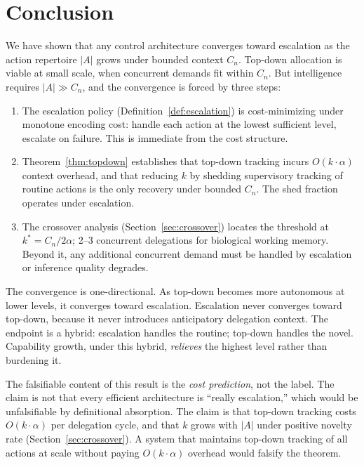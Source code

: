 \documentclass[11pt]{article}
\theoremstyle{definition}
\begin{document}
\section{Conclusion}
\label{sec:conclusion}

We have shown that any control architecture converges toward
escalation as the action repertoire $|A|$ grows under bounded context
$C_n$. Top-down allocation is viable at small scale, when concurrent
demands fit within $C_n$. But intelligence requires $|A| \gg C_n$,
and the convergence is forced by three steps:

\begin{enumerate}
\item The escalation policy (Definition~\ref{def:escalation}) is
   cost-minimizing under monotone encoding cost: handle each action at
   the lowest sufficient level, escalate on failure. This is immediate
   from the cost structure.

\item Theorem~\ref{thm:topdown} establishes that top-down tracking
   incurs $O(k \cdot \alpha)$ context overhead, and that reducing $k$
   by shedding supervisory tracking of routine actions is the only
   recovery under bounded $C_n$. The shed fraction operates under
   escalation.

\item The crossover analysis (Section~\ref{sec:crossover}) locates the
   threshold at $k^* = C_n / 2\alpha$; 2--3 concurrent delegations
   for biological working memory. Beyond it, any additional concurrent
   demand must be handled by escalation or inference quality degrades.
\end{enumerate}

The convergence is one-directional. As top-down becomes more
autonomous at lower levels, it converges toward escalation.
Escalation never converges toward top-down, because it never
introduces anticipatory delegation context. The endpoint is a hybrid:
escalation handles the routine; top-down handles the novel. Capability
growth, under this hybrid, \emph{relieves} the highest level rather
than burdening it.

The falsifiable content of this result is the \emph{cost prediction},
not the label. The claim is not that every efficient architecture is
``really escalation,'' which would be unfalsifiable by definitional
absorption. The claim is that top-down tracking costs $O(k \cdot
\alpha)$ per delegation cycle, and that $k$ grows with $|A|$ under
positive novelty rate (Section~\ref{sec:crossover}). A system that
maintains top-down tracking of all actions at scale without paying
$O(k \cdot \alpha)$ overhead would falsify the theorem.
\end{document}
